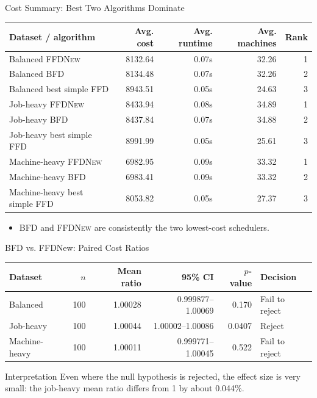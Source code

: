 \documentclass[aspectratio=169,10pt]{beamer}
\newcommand{\alg}[1]{\textsc{#1}}
\begin{document}
\begin{frame}{Cost Summary: Best Two Algorithms Dominate}
  \begin{table}
    \centering
    \scriptsize
    \begin{tabular}{@{}lrrrr@{}}
      \toprule
      Dataset / algorithm & Avg. cost & Avg. runtime & Avg. machines & Rank\\
      \midrule
      Balanced \alg{FFDNew} & 8132.64 & 0.07s & 32.26 & 1\\
      Balanced \alg{BFD} & 8134.48 & 0.07s & 32.26 & 2\\
      Balanced best simple FFD & 8943.51 & 0.05s & 24.63 & 3\\
      \addlinespace
      Job-heavy \alg{FFDNew} & 8433.94 & 0.08s & 34.89 & 1\\
      Job-heavy \alg{BFD} & 8437.84 & 0.07s & 34.88 & 2\\
      Job-heavy best simple FFD & 8991.99 & 0.05s & 25.61 & 3\\
      \addlinespace
      Machine-heavy \alg{FFDNew} & 6982.95 & 0.09s & 33.32 & 1\\
      Machine-heavy \alg{BFD} & 6983.41 & 0.09s & 33.32 & 2\\
      Machine-heavy best simple FFD & 8053.82 & 0.05s & 27.37 & 3\\
      \bottomrule
    \end{tabular}
  \end{table}
  \vspace{-0.1cm}
  \begin{itemize}
    \item \alg{BFD} and \alg{FFDNew} are consistently the two lowest-cost schedulers.
  \end{itemize}
\end{frame}

\begin{frame}{BFD vs. FFDNew: Paired Cost Ratios}
  \begin{table}
    \centering
    \small
    \begin{tabular}{@{}lrrrrl@{}}
      \toprule
      Dataset & $n$ & Mean ratio & 95\% CI & $p$-value & Decision\\
      \midrule
      Balanced & 100 & 1.00028 & 0.999877--1.00069 & 0.170 & Fail to reject\\
      Job-heavy & 100 & 1.00044 & 1.00002--1.00086 & 0.0407 & Reject\\
      Machine-heavy & 100 & 1.00011 & 0.999771--1.00045 & 0.522 & Fail to reject\\
      \bottomrule
    \end{tabular}
  \end{table}
  \vspace{0.2cm}
  \begin{block}{Interpretation}
    Even where the null hypothesis is rejected, the effect size is very small: the job-heavy mean ratio differs from 1 by about 0.044\%.
  \end{block}
\end{frame}
\end{document}
